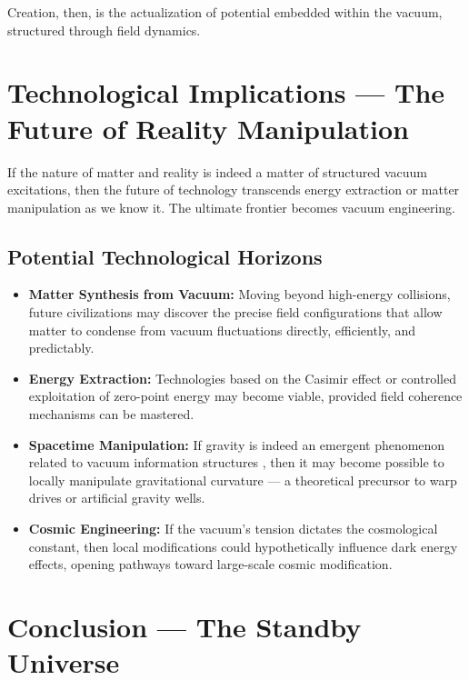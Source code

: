 \documentclass[12pt,a4paper]{article}
\begin{document}
Creation, then, is the actualization of potential embedded within the vacuum, structured through field dynamics.

\section{Technological Implications — The Future of Reality Manipulation}

If the nature of matter and reality is indeed a matter of structured vacuum excitations, then the future of technology transcends energy extraction or matter manipulation as we know it. The ultimate frontier becomes vacuum engineering.

\subsection{Potential Technological Horizons}

\begin{itemize}
    \item \textbf{Matter Synthesis from Vacuum:} Moving beyond high-energy collisions, future civilizations may discover the precise field configurations that allow matter to condense from vacuum fluctuations directly, efficiently, and predictably.
    
    \item \textbf{Energy Extraction:} Technologies based on the Casimir effect or controlled exploitation of zero-point energy may become viable, provided field coherence mechanisms can be mastered.
    
    \item \textbf{Spacetime Manipulation:} If gravity is indeed an emergent phenomenon related to vacuum information structures \cite{verlinde2016}, then it may become possible to locally manipulate gravitational curvature — a theoretical precursor to warp drives or artificial gravity wells.
    
    \item \textbf{Cosmic Engineering:} If the vacuum's tension dictates the cosmological constant, then local modifications could hypothetically influence dark energy effects, opening pathways toward large-scale cosmic modification.
\end{itemize}

\section{Conclusion — The Standby Universe}
\end{document}
